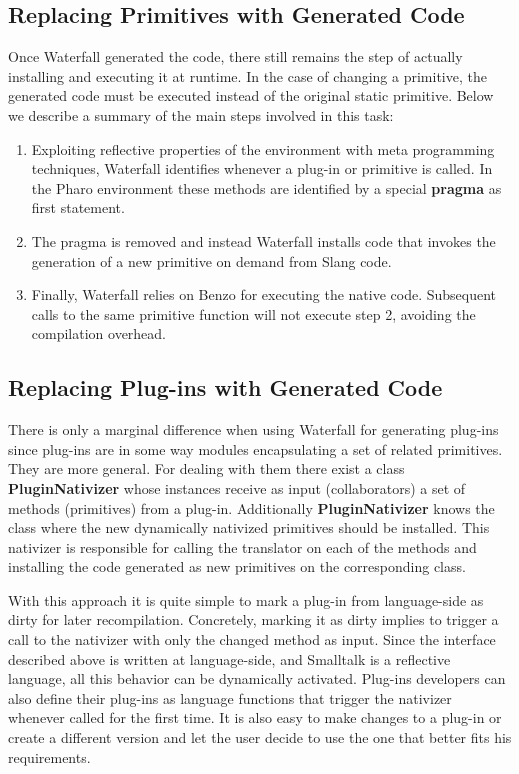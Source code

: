 \documentclass[10pt,preprint,letter]{sigplanconf}
\newcommand{\ST}  {Small\-talk\xspace}
\newcommand{\PH}  {Pharo\xspace}
\newcommand{\W}{Waterfall\xspace}
\newcommand{\B}{Benzo\xspace}
\begin{document}
\subsection{Replacing Primitives with Generated Code}
Once \W generated the code, there still remains the step of actually installing and executing it at runtime.
In the case of changing a primitive, the generated code must be executed instead of the original static primitive.
Below we describe a summary of the main steps involved in this task: 

\begin{enumerate}
	\item Exploiting reflective properties of the environment with meta programming techniques, \W identifies whenever a plug-in or primitive is called. 
	In the \PH environment these methods are identified by a special \textbf{pragma} as first statement.

	\item The pragma is removed and instead \W installs code that invokes the generation of a new primitive on demand from Slang code.

	\item Finally, \W relies on \B for executing the native code. Subsequent calls to the same primitive function will not execute step 2, avoiding the compilation overhead.
\end{enumerate}

\subsection{Replacing Plug-ins with Generated Code} 
There is only a marginal difference when using \W for generating plug-ins since plug-ins are in some way modules encapsulating a set of related primitives. They are more general.
For dealing with them there exist a class \textbf{PluginNativizer} whose instances receive as input (collaborators) a set of methods (primitives) from a plug-in.
Additionally \textbf{PluginNativizer} knows the class where the new dynamically nativized primitives should be installed.
This nativizer is responsible for calling the translator on each of the methods and installing the code generated as new primitives on the corresponding class. 

With this approach it is quite simple to mark a plug-in from language-side as dirty for later recompilation.
Concretely, marking it as dirty implies to trigger a call to the nativizer with only the changed method as input.
Since the interface described above is written at language-side, and \ST is a reflective language, all this behavior can be dynamically activated.
Plug-ins developers can also define their plug-ins as language functions that trigger the nativizer whenever called for the first time.
It is also easy to make changes to a plug-in or create a different version and let the user decide to use the one that better fits his requirements.
\end{document}

